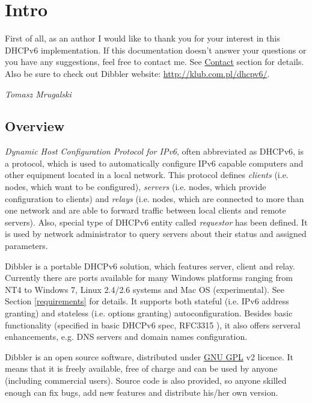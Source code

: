 
\section{Intro}
First of all, as an author I would like to thank you for your interest
in this DHCPv6 implementation. If this documentation doesn't answer
your questions or you have any suggestions, feel free to contact
me. See \hyperlink{contact}{Contact} section for details. Also be sure
to check out Dibbler website: \url{http://klub.com.pl/dhcpv6/}.

\begin{flushright}
\emph{Tomasz Mrugalski}
\end{flushright}

\subsection{Overview}

\emph{Dynamic Host Configuration Protocol for IPv6}, often abbreviated
as DHCPv6, is a protocol, which is used to automatically configure IPv6
capable computers and other equipment located in a local network. This
protocol defines \emph{clients} (i.e. nodes, which want to be configured),
\emph{servers} (i.e. nodes, which provide configuration to clients) and
\emph{relays} (i.e. nodes, which are connected to more than one network and
are able to forward traffic between local clients and remote
servers). Also, special type of DHCPv6 entity called \emph{requestor}
has been defined. It is used by network administrator to query servers
about their status and assigned parameters.

Dibbler is a portable DHCPv6 solution, which features server, client and
relay. Currently there are ports available for many Windows platforms
ranging from NT4 to Windows 7, Linux 2.4/2.6 systems and Mac OS
(experimental). See Section \ref{requirements} for details. It supports both stateful
(i.e. IPv6 address granting) and stateless (i.e. options granting)
autoconfiguration. Besides basic
functionality (specified in basic DHCPv6 spec, RFC3315 \cite{rfc3315}),
it also offers serveral enhancements, e.g. DNS servers and domain names
configuration.

Dibbler is an open source software, distributed under
\href{http://www.gnu.org/copyleft/gpl.html}{GNU GPL} v2 licence. It means
that it is freely available, free of charge and can be used by anyone
(including commercial users). Source code is also provided, so anyone
skilled enough can fix bugs, add new features and distribute his/her
own version.

